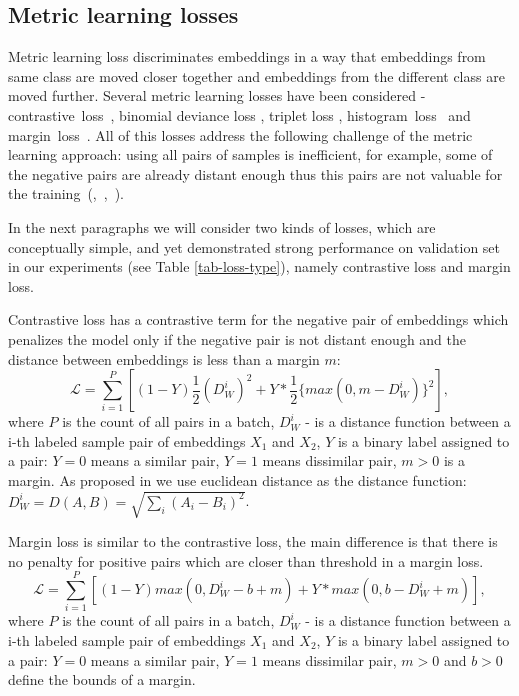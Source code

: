 \documentclass[sigconf, anonymous]{acmart}
\begin{document}
\subsection{Metric learning losses} \label{sec-ml-loss}

Metric learning loss discriminates embeddings in a way that embeddings from same class are moved closer together and embeddings from the different class are moved further. Several metric learning losses have been considered - contrastive~loss~\cite{Hadsell:2006:DRL:1153171.1153654}, binomial deviance loss \cite{Yi:2014:LUE:1407.4979}, triplet loss \cite{Hoffer:2015:LUE:1412.6622}, histogram~loss~\cite{histogram-loss} and margin~loss~\cite{wu2017sampling}. All of this losses address the following challenge of the metric learning approach: using all pairs of samples is inefficient, for example, some of the negative pairs are already distant enough thus this pairs are not valuable for the training~(\cite{simo2015discriminative},~\cite{wu2017sampling},~\cite{Schroff2015FaceNetAU}).

In the next paragraphs we will consider two kinds of losses, which are conceptually simple, and yet demonstrated strong performance on validation set in our experiments (see Table \ref{tab-loss-type}), namely contrastive loss and margin loss.

Contrastive loss has a contrastive term for the negative pair of embeddings which penalizes the model only if the negative pair is not distant enough and the distance between embeddings is less than a margin $m$:  
\begin{equation}
 \mathcal{L} = \sum_{i=1}^P \left[ (1-Y)\dfrac{1}{2}(D_W^i)^2 +Y*\dfrac{1}{2}\{max(0,m-D_W^i)\}^2 \right],
\end{equation}
where $P$ is the count of all pairs in a batch, $D_W^i$ - is a distance function between a i-th labeled sample pair of embeddings $X_1$ and $X_2$, 
$Y$ is a binary label assigned to a pair: $Y = 0$ means a similar pair, $Y = 1$ means dissimilar pair, $m > 0$ is a margin.
As proposed in \cite{Hadsell:2006:DRL:1153171.1153654} we use euclidean distance as the distance function: $D_W^i = D(A,B) = \sqrt{\sum_i(A_i - B_i)^2}$.

Margin loss is similar to the contrastive loss, the main difference is that there is no penalty for positive pairs which are closer than threshold in a margin loss.
\begin{equation}
 \mathcal{L} = \sum_{i=1}^P \left[ (1-Y)max(0, D_W^i - b + m) + Y*max(0, b-D_W^i + m) \right],
\end{equation}
where $P$ is the count of all pairs in a batch, $D_W^i$ - is a distance function between a i-th labeled sample pair of embeddings $X_1$ and $X_2$,
$Y$ is a binary label assigned to a pair: $Y = 0$ means a similar pair, $Y = 1$ means dissimilar pair, $m > 0$ and $b > 0$ define the bounds of a margin.
\end{document}

